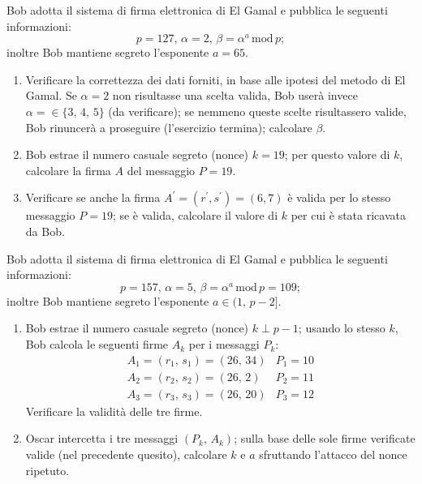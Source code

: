        Bob adotta il sistema di firma elettronica di El Gamal e pubblica le seguenti informazioni: \[
            p=127,\, \alpha = 2,\, \beta = \alpha^a\,\mathrm{mod}\,p
        ;\] inoltre Bob mantiene segreto l'esponente $a=65$.
        \begin{enumerate}
            \item Verificare la correttezza dei dati forniti, in base alle ipotesi del metodo di El Gamal. 
                Se $\alpha=2$ non risultasse una scelta valida, Bob userà invece $\alpha=\in\{3,\,4,\,5\}$ 
                (da verificare); se nemmeno queste scelte risultassero valide, Bob rinuncerà a proseguire 
                (l'esercizio termina); calcolare $\beta$.
            \item Bob estrae il numero casuale segreto (nonce) $k=19$; per questo valore di $k$, calcolare 
                la firma $A$ del messaggio $P=19$.
            \item Verificare se anche la firma $A^{\prime}=(r^{\prime}, s^{\prime})=(6,7)$ è valida per 
                lo stesso messaggio $P=19$; se è valida, calcolare il valore di $k$ per cui è stata ricavata da Bob.
        \end{enumerate}

        Bob adotta il sistema di firma elettronica di El Gamal e pubblica le seguenti informazioni: \[
            p=157,\, \alpha = 5,\, \beta = \alpha^a\,\mathrm{mod}\,p=109
        ;\] inoltre Bob mantiene segreto l'esponente $a\in (1,\,p-2]$.
        \begin{enumerate}
            \item Bob estrae il numero casuale segreto (nonce) $k\perp p-1$; usando lo stesso $k$, 
                Bob calcola le seguenti firme $A_k$ per i messaggi $P_k$:
                \[\begin{array}{ll}
                    A_1=(r_1,\,s_1)=(26,\,34) & P_1=10\\
                    A_2=(r_2,\,s_2)=(26,\,2) & P_2=11\\
                    A_3=(r_3,\,s_3)=(26,\,20) & P_3=12
                \end{array}\]
                Verificare la validità delle tre firme.
            \item Oscar intercetta i tre messaggi $(P_k,\,A_k)$; sulla base delle sole firme verificate valide 
                (nel precedente quesito), calcolare $k$ e $a$ sfruttando l'attacco del nonce ripetuto.
        \end{enumerate}

